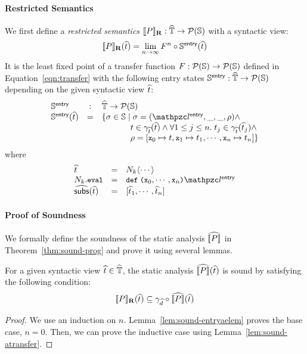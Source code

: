 \paragraph{Restricted Semantics} We first define a \textit{restricted semantics}
$\llbracket{P}\rrbracket_\textbf{R}: \widehat{\mathbb{T}} \rightarrow \mathcal{P}(\mathbb{S})$ with a syntactic view:
\[
  \llbracket{P}\rrbracket_\textbf{R}(\widehat{t}) = \lim_{n \rightarrow \infty}F^n \circ
  \mathbb{S}^{\textsf{entry}}(\widehat{t})
\]
It is the least fixed point of a transfer function $F: \mathcal{P}(\mathbb{S})
\rightarrow \mathcal{P}(\mathbb{S})$ defined in Equation~\ref{eqn:transfer} with the
following entry states $\mathbb{S}^{\textsf{entry}}: \widehat{\mathbb{T}} \rightarrow \mathcal{P}(\mathbb{S})$
depending on the given syntactic view $\widehat{t}$:
\[
  \begin{array}{lcl}
    \entrystset &:& \atreeset \rightarrow \powerset{\stset}\\

    \entrystset(\atree) &=& \{ \st \in \stset \mid
      \st = (\entrylab, \_, \_, \env) \wedge\\&&

      \phantom{\{ \st \in \stset \mid}
        \tree \in \atreegamma(\atree) \wedge \forall 1 \leq j \leq n. \;
      \tree_j \in \atreegamma(\atree_j) \wedge\\&&

      \phantom{\{ \st \in \stset \mid}
        \env = [\varx_0 \mapsto \tree, \varx_1 \mapsto \tree_1, \cdots,
        \varx_n \mapsto \tree_n]
      \}\\
    \end{array}
  \]
where
\[
  \begin{array}{lcl}
    \atree &=& \nt_k \langle \cdots \rangle\\
    \nt_k.\eval &=& \kwdef \; \kwrl \varx_0, \cdots, \varx_n \kwrr \entrylab\\
    \agetsubs(\atree) &=& [\atree_1, \cdots, \atree_n]\\
  \end{array}
\]


\paragraph{Proof of Soundness} We formally define the soundness of the static
analysis $\widehat{\llbracket{P}\rrbracket}$ in Theorem~\ref{thm:sound-prog} and prove it using
several lemmas.

\begin{theorem}\label{thm:sound-prog}
  For a given syntactic view $\widehat{t} \in \widehat{\mathbb{T}}$, the static analysis
  $\widehat{\llbracket{P}\rrbracket}(\widehat{t})$ is sound by satisfying the following condition:
  \[
    \llbracket{P}\rrbracket_\textbf{R}(\widehat{t}) \subseteq \gamma_{\widehat{d}} \circ \widehat{\llbracket{P}\rrbracket}(\widehat{t})
  \]
\end{theorem}
\begin{proof}
  We use an induction on $n$.  Lemma~\ref{lem:sound-entryaelem} proves the base
  case, $n=0$. Then, we can prove the inductive case using
  Lemma~\ref{lem:sound-atransfer}.
\end{proof}

